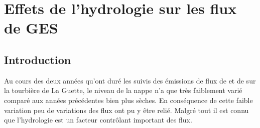 \chapter{Effets de l'hydrologie sur les flux de GES}

\minitoc

\newpage

\section{Introduction}

Au cours des deux années qu'ont duré les suivis des émissions de flux de \coo et de \chh sur la tourbière de La Guette, le niveau de la nappe n'a que très faiblement varié comparé aux années précédentes bien plus sèches.
En conséquence de cette faible variation peu de variations des flux ont pu y être relié.
Malgré tout il est connu que l'hydrologie est un facteur contrôlant important des flux.

